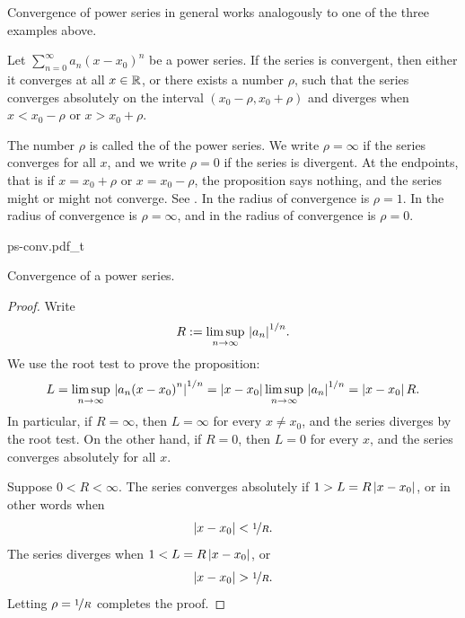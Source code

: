 Convergence of power series in general works analogously to
one of the three examples above.

\begin{prop} \label{prop:powerserrealradius}
Let $\sum_{n=0}^\infty a_n {(x-x_0)}^n$ be a power series.
If the series is convergent, then either it converges at
all $x \in {\mathbb{R}}$, or
there exists a number $\rho$, such that
the series converges absolutely on the interval
$(x_0-\rho,x_0+\rho)$ and diverges when $x < x_0-\rho$ or $x > x_0+\rho$.
\end{prop}

The number $\rho$ is called the \emph{} of the
power series.  We write $\rho = \infty$ if the series converges for
all $x$, and we write $\rho = 0$ if the series is divergent.
At the endpoints, that is if $x = x_0+\rho$ or $x = x_0-\rho$,
the proposition says nothing,
and the series might or might not converge.
See .
In 
the radius of convergence is $\rho=1$.
In  the radius of convergence is $\rho=\infty$,
and in  the radius of convergence is $\rho=0$.

\begin{myfigureht}
{ps-conv.pdf_t}
\caption{Convergence of a power series.\label{ps:convfig}}
\end{myfigureht}

\begin{proof}
Write
\begin{equation*}
R := \limsup_{n\to\infty} \, {\left\lvert {a_n} \right\rvert}^{1/n} .
\end{equation*}
We use the root test to prove the proposition:
\begin{equation*}
L = \limsup_{n\to\infty} \, {\left\lvert {a_n {(x-x_0)}^n} \right\rvert}^{1/n} 
=
\left\lvert {x-x_0} \right\rvert \limsup_{n\to\infty} \, {\left\lvert {a_n} \right\rvert}^{1/n}
=
\left\lvert {x-x_0} \right\rvert R .
\end{equation*}
In particular, if $R = \infty$, then $L=\infty$ for every $x \not= x_0$, and
the series diverges by the root test.
On the other hand,
if $R = 0$, then $L=0$ for every $x$,
and the series converges absolutely for all $x$.

Suppose $0 < R < \infty$.
The series
converges absolutely if
$1 > L = R \left\lvert {x-x_0} \right\rvert$,
or in other words when
\begin{equation*}
\left\lvert {x-x_0} \right\rvert < \nicefrac{1}{R} .
\end{equation*}
The series diverges when
$1 < L = R \left\lvert {x-x_0} \right\rvert$,
or
\begin{equation*}
\left\lvert {x-x_0} \right\rvert > \nicefrac{1}{R} .
\end{equation*}
Letting $\rho = \nicefrac{1}{R}$ completes the proof.
\end{proof}

